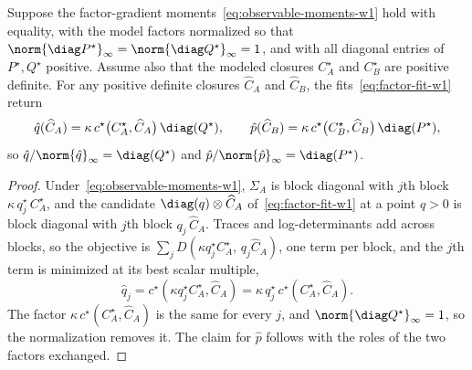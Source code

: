 \begin{lemma}\label{lem:consistency-w1}
Suppose the factor-gradient moments~\eqref{eq:observable-moments-w1} hold with
equality, with the model factors normalized so that
$\norm{\diag P^\star}_\infty=\norm{\diag Q^\star}_\infty=1$, and with all
diagonal entries of $P^\star,Q^\star$ positive. Assume also that the modeled
closures $C^\star_A$ and $C^\star_B$ are positive definite. For any positive
definite closures $\widehat C_A$ and $\widehat C_B$, the
fits~\eqref{eq:factor-fit-w1} return
\[
  \hat{q}(\widehat C_A)=\kappa\,c^\star\big(C^\star_A,\widehat C_A\big)\,\diag(Q^\star),
  \qquad
  \hat{p}(\widehat C_B)=\kappa\,c^\star\big(C^\star_B,\widehat C_B\big)\,\diag(P^\star),
\]
so $\hat{q}/\norm{\hat{q}}_\infty=\diag(Q^\star)$ and
$\hat{p}/\norm{\hat{p}}_\infty=\diag(P^\star)$.
\end{lemma}
\begin{proof}
Under~\eqref{eq:observable-moments-w1}, $\Sigma_A$ is
block diagonal with $j$th block $\kappa\,q^\star_j\,C^\star_A$, and the
candidate $\diag(q)\otimes\widehat C_A$ of~\eqref{eq:factor-fit-w1} at a
point $q>0$ is block diagonal with $j$th block $q_j\,\widehat C_A$. Traces
and log-determinants add across blocks, so the objective is
$\sum_jD(\kappa q^\star_jC^\star_A,\,q_j\widehat C_A)$, one term per block,
and the $j$th term is minimized at its best scalar multiple,
\[
\hat{q}_j=c^\star(\kappa q^\star_jC^\star_A,\widehat C_A)
=\kappa\,q^\star_j\,c^\star(C^\star_A,\widehat C_A).
\]
The factor $\kappa\,c^\star(C^\star_A,\widehat C_A)$ is the same for every
$j$, and $\norm{\diag Q^\star}_\infty=1$, so the normalization removes it.
The claim for $\hat{p}$ follows with the roles of the two factors exchanged.
\end{proof}

